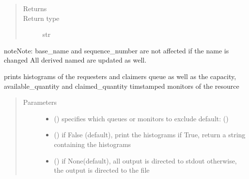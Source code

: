 \documentclass[letterpaper,10pt,english]{sphinxmanual}
\begin{document}
\begin{fulllineitems}
\begin{fulllineitems}
\begin{quote}
\begin{description}
\item[{Returns}] \leavevmode
{}

\item[{Return type}] \leavevmode
str

\end{description}\end{quote}

\begin{sphinxadmonition}{note}{Note:}
base\_name and sequence\_number are not affected if the name is changed 
All derived named are updated as well.
\end{sphinxadmonition}

\end{fulllineitems}


\begin{fulllineitems}
\label{\detokenize{Reference:salabim.Resource.print_histograms}}
prints histograms of the requesters and claimers queue as well as
the capacity, available\_quantity and claimed\_quantity timstamped monitors of the resource
\begin{quote}\begin{description}
\item[{Parameters}] \leavevmode\begin{itemize}
\item {} 
 () \textendash{} specifies which queues or monitors to exclude 
default: ()

\item {} 
 () \textendash{} if False (default), print the histograms
if True, return a string containing the histograms

\item {} 
 () \textendash{} if None(default), all output is directed to stdout 
otherwise, the output is directed to the file

\end{itemize}


\end{description}
\end{quote}
\end{fulllineitems}
\end{fulllineitems}
\end{document}
